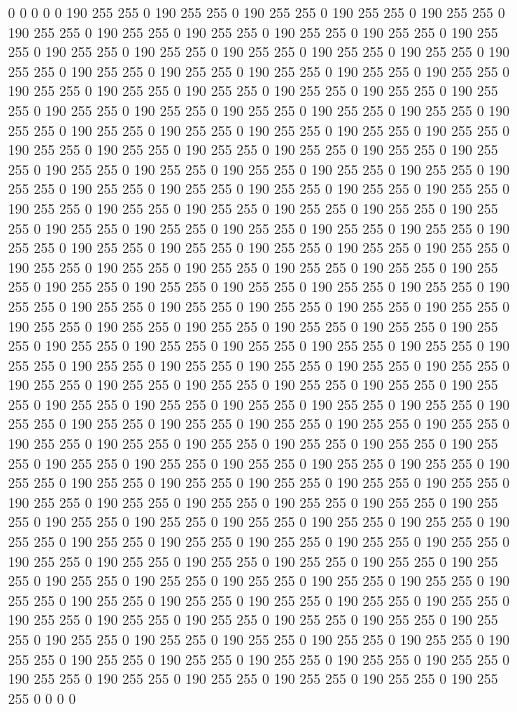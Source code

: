 0 0 0 0 0 190 255 255 0 190 255 255 0 190 255 255 0 190 255 255 0 190 255 255 0 190 255 255 0 190 255 255 0 190 255 255 0 190 255 255 0 190 255 255 0 190 255 255 0 190 255 255 0 190 255 255 0 190 255 255 0 190 255 255 0 190 255 255 0 190 255 255 0 190 255 255 0 190 255 255 0 190 255 255 0 190 255 255 0 190 255 255 0 190 255 255 0 190 255 255 0 190 255 255 0 190 255 255 0 190 255 255 0 190 255 255 0 190 255 255 0 190 255 255 0 190 255 255 0 190 255 255 0 190 255 255 0 190 255 255 0 190 255 255 0 190 255 255 0 190 255 255 0 190 255 255 0 190 255 255 0 190 255 255 0 190 255 255 0 190 255 255 0 190 255 255 0 190 255 255 0 190 255 255 0 190 255 255 0 190 255 255 0 190 255 255 0 190 255 255 
0 190 255 255 0 190 255 255 0 190 255 255 0 190 255 255 0 190 255 255 0 190 255 255 0 190 255 255 0 190 255 255 0 190 255 255 0 190 255 255 0 190 255 255 0 190 255 255 0 190 255 255 0 190 255 255 0 190 255 255 0 190 255 255 0 190 255 255 0 190 255 255 0 190 255 255 0 190 255 255 0 190 255 255 0 190 255 255 0 190 255 255 0 190 255 255 0 190 255 255 0 190 255 255 0 190 255 255 0 190 255 255 0 190 255 255 0 190 255 255 0 190 255 255 0 190 255 255 0 190 255 255 0 190 255 255 0 190 255 255 0 190 255 255 0 190 255 255 0 190 255 255 0 190 255 255 0 190 255 255 0 190 255 255 0 190 255 255 0 190 255 255 0 190 255 255 0 190 255 255 0 190 255 255 0 190 255 255 0 190 255 255 0 190 255 255 0 190 255 255 
0 190 255 255 0 190 255 255 0 190 255 255 0 190 255 255 0 190 255 255 0 190 255 255 0 190 255 255 0 190 255 255 0 190 255 255 0 190 255 255 0 190 255 255 0 190 255 255 0 190 255 255 0 190 255 255 0 190 255 255 0 190 255 255 0 190 255 255 0 190 255 255 0 190 255 255 0 190 255 255 0 190 255 255 0 190 255 255 0 190 255 255 0 190 255 255 0 190 255 255 0 190 255 255 0 190 255 255 0 190 255 255 0 190 255 255 0 190 255 255 0 190 255 255 0 190 255 255 0 190 255 255 0 190 255 255 0 190 255 255 0 190 255 255 0 190 255 255 0 190 255 255 0 190 255 255 0 190 255 255 0 190 255 255 0 190 255 255 0 190 255 255 0 190 255 255 0 190 255 255 0 190 255 255 0 190 255 255 0 190 255 255 0 190 255 255 0 190 255 255 
0 190 255 255 0 190 255 255 0 190 255 255 0 190 255 255 0 190 255 255 0 190 255 255 0 190 255 255 0 190 255 255 0 190 255 255 0 190 255 255 0 190 255 255 0 190 255 255 0 190 255 255 0 190 255 255 0 190 255 255 0 190 255 255 0 190 255 255 0 190 255 255 0 190 255 255 0 190 255 255 0 190 255 255 0 190 255 255 0 190 255 255 0 190 255 255 0 190 255 255 0 190 255 255 0 190 255 255 0 190 255 255 0 190 255 255 0 190 255 255 0 190 255 255 0 190 255 255 0 190 255 255 0 190 255 255 0 190 255 255 0 190 255 255 0 190 255 255 0 190 255 255 0 190 255 255 0 190 255 255 0 190 255 255 0 190 255 255 0 190 255 255 0 190 255 255 0 190 255 255 0 190 255 255 0 190 255 255 0 190 255 255 0 190 255 255 0 0 0 0 
